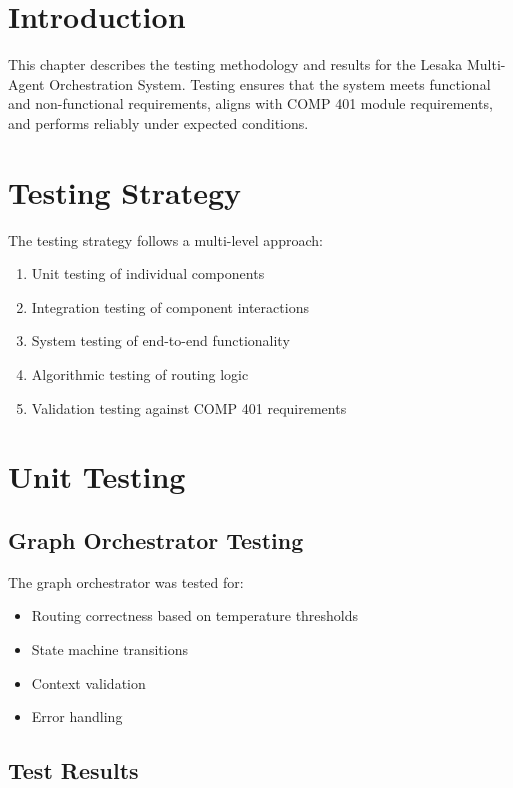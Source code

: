 
\section{Introduction}

This chapter describes the testing methodology and results for the Lesaka Multi-Agent Orchestration System. Testing ensures that the system meets functional and non-functional requirements, aligns with COMP 401 module requirements, and performs reliably under expected conditions.

\section{Testing Strategy}

The testing strategy follows a multi-level approach:

\begin{enumerate}
    \item Unit testing of individual components
    \item Integration testing of component interactions
    \item System testing of end-to-end functionality
    \item Algorithmic testing of routing logic
    \item Validation testing against COMP 401 requirements
\end{enumerate}

\section{Unit Testing}

\subsection{Graph Orchestrator Testing}

The graph orchestrator was tested for:

\begin{itemize}
    \item Routing correctness based on temperature thresholds
    \item State machine transitions
    \item Context validation
    \item Error handling
\end{itemize}

\subsection{Test Results}


